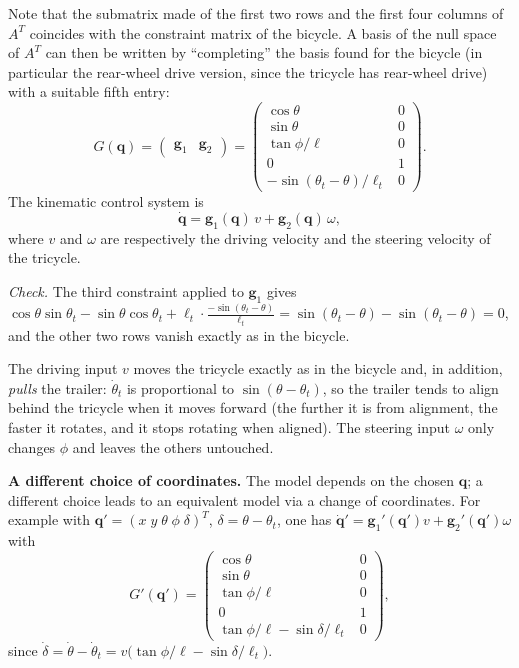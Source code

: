 \documentclass[11pt,a4paper]{article}
\theoremstyle{definition}
\theoremstyle{plain}
\newcommand{\qv}{\bm{q}}
\begin{document}
Note that the submatrix made of the first two rows and the first four columns of $A^T$ coincides with the constraint matrix of the bicycle. A basis of the null space of $A^T$ can then be written by ``completing'' the basis found for the bicycle (in particular the rear-wheel drive version, since the tricycle has rear-wheel drive) with a suitable fifth entry:
\[
 G(\qv)=\begin{pmatrix}\bm g_1&\bm g_2\end{pmatrix}=
 \begin{pmatrix}
  \cos\theta&0\\ \sin\theta&0\\ \tan\phi/\ell&0\\0&1\\ -\sin(\theta_t-\theta)/\ell_t&0
 \end{pmatrix}.
\]
The kinematic control system is
\[
 \dot{\qv}=\bm g_1(\qv)\,v+\bm g_2(\qv)\,\omega ,
\]
where $v$ and $\omega$ are respectively the driving velocity and the steering velocity of the tricycle.

\emph{Check.} The third constraint applied to $\bm g_1$ gives $\cos\theta\sin\theta_t-\sin\theta\cos\theta_t+\ell_t\cdot\frac{-\sin(\theta_t-\theta)}{\ell_t}=\sin(\theta_t-\theta)-\sin(\theta_t-\theta)=0$, and the other two rows vanish exactly as in the bicycle.

\begin{intuition}
The driving input $v$ moves the tricycle exactly as in the bicycle and, in addition, \emph{pulls} the trailer: $\dot\theta_t$ is proportional to $\sin(\theta-\theta_t)$, so the trailer tends to align behind the tricycle when it moves forward (the further it is from alignment, the faster it rotates, and it stops rotating when aligned). The steering input $\omega$ only changes $\phi$ and leaves the others untouched.
\end{intuition}

\textbf{A different choice of coordinates.} The model depends on the chosen $\qv$; a different choice leads to an equivalent model via a change of coordinates. For example with $\qv'=(x\;y\;\theta\;\phi\;\delta)^T$, $\delta=\theta-\theta_t$, one has $\dot{\qv}'=\bm g_1'(\qv')v+\bm g_2'(\qv')\omega$ with
\[
 G'(\qv')=\begin{pmatrix}
  \cos\theta&0\\ \sin\theta&0\\ \tan\phi/\ell&0\\0&1\\ \tan\phi/\ell-\sin\delta/\ell_t&0
 \end{pmatrix},
\]
since $\dot\delta=\dot\theta-\dot\theta_t=v\big(\tan\phi/\ell-\sin\delta/\ell_t\big)$.
\end{document}
